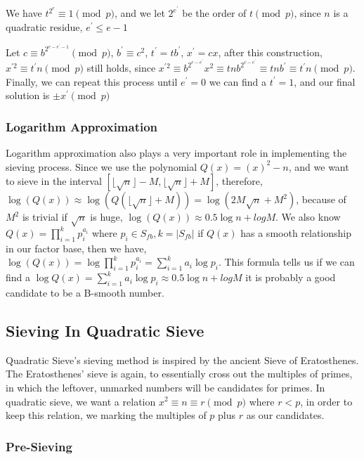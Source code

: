 \documentclass[12pt]{article} %
\begin{document}
	We have $t^{2^e} \equiv 1 \pmod{p}$, and we let $2^{e^\prime}$ be the order of $t \pmod{p}$, since $n$ is a quadratic residue, $e^\prime \le e-1$
	
	Let $c \equiv b^{2^{e-e^\prime-1}} \pmod{p}$, $b^\prime \equiv c^2$, $t^\prime = tb^\prime$, $x^\prime = cx$, after this construction, $x^{\prime 2} \equiv t^\prime n \pmod{p}$ still holds, since $x^{\prime 2} \equiv b^{2^{e-e^\prime}}x^2 \equiv tnb^{2^{e-e^\prime}} \equiv tnb^\prime \equiv  t^\prime n \pmod{p}$. Finally, we can repeat this process until $e^\prime = 0$ we can find a $t^\prime = 1$, and our final solution is $ \pm x^\prime \pmod{p}$
	
	\subsubsection{Logarithm Approximation}
	
	Logarithm approximation also plays a very important role in implementing the sieving process.
	Since we use the polynomial $Q(x) = (x)^2-n$, and we want to sieve in the interval  $[\lfloor \sqrt{n} \rfloor - M, \lfloor \sqrt{n} \rfloor + M]$, therefore, $\log{(Q(x))} \approx \log{(Q(\lfloor \sqrt{n} \rfloor + M))} = \log{(2M\sqrt{n}+M^2)}$, because of $M^2$ is trivial if $\sqrt{n}$ is huge, $\log{(Q(x))} \approx 0.5\log{n} + log{M}$. We also know $Q(x) = \prod_{i=1}^k{p_i^{a_i}}$ where $p_i \in S_{fb}, k=|S_{fb}|$ if $Q(x)$ has a smooth relationship in our factor base, then we have,  $\log{(Q(x))} = \log{\prod_{i=1}^k{p_i^{a_i}}} = \sum_{i=1}^k{a_i\log{p_i}}$. This formula tells us if we can find a $\log{Q(x)} = \sum_{i=1}^k{a_i\log{p_i}} \approx 0.5\log{n} + log{M}$ it is probably a good candidate to be a B-smooth number.
	
	\subsection {Sieving In Quadratic Sieve}
	
	Quadratic Sieve's sieving method is inspired by the ancient Sieve of Eratosthenes. The Eratosthenes' sieve is again, to essentially cross out the multiples of primes, in which the leftover, unmarked numbers will be candidates for primes. In quadratic sieve, we want a relation $x^2 \equiv n \equiv r \pmod{p}$ where $r < p$, in order to keep this relation, we marking the multiples of $p$ plus $r$ as our candidates. 
	
	\subsubsection {Pre-Sieving}
	
\end{document}
